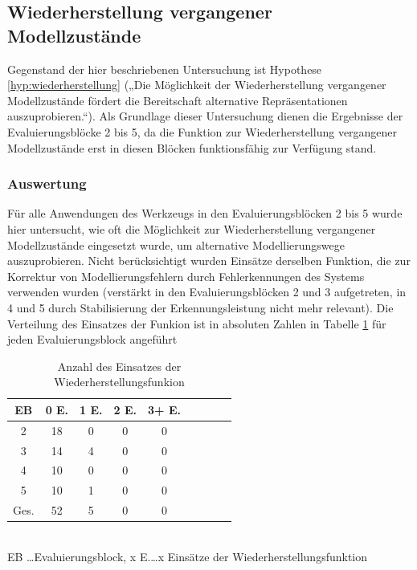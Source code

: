 
\subsection{Wiederherstellung vergangener Modellzustände} %
\label{sub:wiederherstellung_vergangener_modellzustände}

Gegenstand der hier beschriebenen Untersuchung ist Hypothese \ref{hyp:wiederherstellung} („Die Möglichkeit der Wiederherstellung vergangener Modellzustände fördert die Bereitschaft alternative Repräsentationen auszuprobieren.“). Als Grundlage dieser Untersuchung dienen die Ergebnisse der Evaluierungsblöcke 2 bis 5, da die Funktion zur Wiederherstellung vergangener Modellzustände erst in diesen Blöcken funktionsfähig zur Verfügung stand.

\subsubsection{Auswertung} 

Für alle Anwendungen des Werkzeugs in den Evaluierungsblöcken 2 bis 5 wurde hier untersucht, wie oft die Möglichkeit zur Wiederherstellung vergangener Modellzustände eingesetzt wurde, um alternative Modellierungswege auszuprobieren. Nicht berücksichtigt wurden Einsätze derselben Funktion, die zur Korrektur von Modellierungsfehlern durch Fehlerkennungen des Systems verwenden wurden (verstärkt in den Evaluierungsblöcken 2 und 3 aufgetreten, in 4 und 5 durch Stabilisierung der Erkennungsleistung nicht mehr relevant). Die Verteilung des Einsatzes der Funkion ist in absoluten Zahlen in Tabelle \ref{tab:anzahl_wiederherstellung} für jeden Evaluierungsblock angeführt

\begin{table}[htbp]
	\centering
	\caption{Anzahl des Einsatzes der Wiederherstellungsfunkion}
\begin{tabular}{| c || c | c | c | c || c | c | c | c |}
  \hline
   EB    & 0 E. & 1 E. & 2 E. & 3+ E. \\ \hline
   2     & 18 & 0 & 0 & 0 \\ 
   3     & 14 & 4 & 0 & 0 \\ 
   4     & 10 & 0 & 0 & 0 \\ 
   5     & 10 & 1 & 0 & 0 \\ \hline
   Ges.  & 52 & 5 & 0 & 0 \\ \hline
\end{tabular} \\
\footnotesize EB \ldots Evaluierungsblock, x E.\ldots x Einsätze der Wiederherstellungsfunktion
	\label{tab:anzahl_wiederherstellung}
\end{table}

